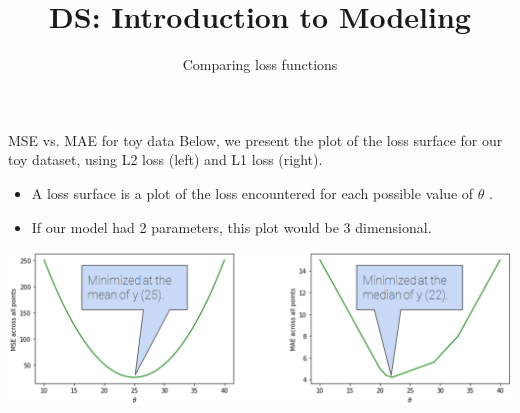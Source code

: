 \documentclass[aspectratio=169]{../latex_main/tntbeamer}  %
\title[Introduction]{DS: Introduction to Modeling}
\subtitle{Comparing loss functions}
\begin{document}
	
	\maketitle
	\begin{frame}{MSE vs. MAE for toy data}
	    Below, we present the plot of the loss surface for our toy dataset, using L2 loss (left) and L1 loss (right).
	    \begin{itemize}
	        \item A loss surface is a plot of the loss encountered for each possible value of    $\theta$ .
	        \item If our model had 2 parameters, this plot would be 3 dimensional.
	    \end{itemize}
	    \centering
	    \includegraphics[scale=.4]{Bild45}
	\end{frame}
	
\end{document}
